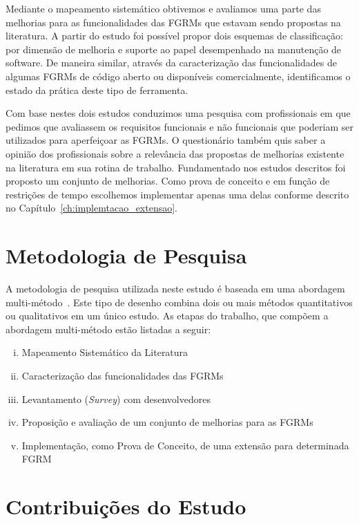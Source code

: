 Mediante o mapeamento sistemático obtivemos e avaliamos uma parte das melhorias
para as funcionalidades das FGRMs que estavam sendo propostas na literatura. A
partir do estudo foi possível propor dois esquemas de classificação: por
dimensão de melhoria e suporte ao papel desempenhado na manutenção de software.
De maneira similar, através da caracterização das funcionalidades de algumas
FGRMs de código aberto ou disponíveis comercialmente, identificamos o estado da
prática deste tipo de ferramenta.

Com base nestes dois estudos conduzimos uma pesquisa com profissionais em que
pedimos que avaliassem os requisitos funcionais e não funcionais que poderiam
ser utilizados para aperfeiçoar as FGRMs. O questionário também quis saber a
opinião dos profissionais sobre a relevância das propostas de me\-lho\-ri\-as
existente na literatura em sua rotina de trabalho. Fundamentado nos estudos
descritos foi proposto um conjunto de melhorias. Como prova de conceito e em
função de restrições de tempo escolhemos implementar apenas uma delas conforme
descrito no Capítulo~\ref{ch:implemtacao_extensao}.

\section{Metodologia de Pesquisa}
\label{sec:intro-metodologia}

A metodologia de pesquisa utilizada neste estudo é baseada em uma abordagem
multi-método~\cite{hesse2010mixed}. Este tipo de desenho combina dois ou mais
métodos quantitativos ou qualitativos em um único estudo. As etapas do
trabalho, que compõem a abordagem multi-método estão listadas a seguir:

\begin{enumerate}[(i)]
	\item Mapeamento Sistemático da Literatura~\cite{Petersen2008}
	\item Caracterização das funcionalidades das FGRMs
    \item Levantamento (\textit{Survey}) com
          desenvolvedores~\cite{wohlin2012experimentation}
	\item Proposição e avaliação de um conjunto de melhorias para as FGRMs
    \item Implementação, como Prova de Conceito, de uma extensão para
        determinada FGRM
\end{enumerate}

\section{Contribuições do Estudo}
\label{sec:intro-contribuicao}

